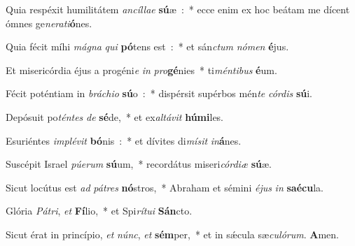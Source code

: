 ﻿\item Quia respéxit humilitátem \emph{an}\emph{cíl}\emph{lae} \textbf{sú}æ~:~* ecce enim ex hoc beátam me dícent ómnes ge\emph{ne}\emph{ra}\emph{ti}\textbf{ó}nes.
\item Quia fécit míhi \emph{má}\emph{gna} \emph{qui} \textbf{pó}tens est~:~* et sán\emph{ctum} \emph{nó}\emph{men} \textbf{é}jus.
\item Et misericórdia éjus a progéni\emph{e} \emph{in} \emph{pro}\textbf{gé}nies~* ti\emph{mén}\emph{ti}\emph{bus} \textbf{é}um.
\item Fécit poténtiam in \emph{brá}\emph{chi}\emph{o} \textbf{sú}o~:~* dispérsit supérbos mén\emph{te} \emph{cór}\emph{dis} \textbf{sú}i.
\item Depósuit po\emph{tén}\emph{tes} \emph{de} \textbf{sé}de,~* et ex\emph{al}\emph{tá}\emph{vit} \textbf{hú}\textbf{mi}les.
\item Esuriéntes \emph{im}\emph{plé}\emph{vit} \textbf{bó}nis~:~* et dívites di\emph{mí}\emph{sit} \emph{in}\textbf{á}nes.
\item Suscépit Israel \emph{pú}\emph{e}\emph{rum} \textbf{sú}um,~* recordátus miseri\emph{cór}\emph{di}\emph{æ} \textbf{sú}æ.
\item Sicut locútus est \emph{ad} \emph{pá}\emph{tres} \textbf{nó}stros,~* Abraham et sémini \emph{é}\emph{jus} \emph{in} \textbf{saé}\textbf{cu}la.
\item Glória \emph{Pá}\emph{tri}, \emph{et} \textbf{Fí}lio,~* et Spi\emph{rí}\emph{tu}\emph{i} \textbf{Sán}cto.
\item Sicut érat in princípio, \emph{et} \emph{núnc}, \emph{et} \textbf{sém}per,~* et in sǽcula sæ\emph{cu}\emph{ló}\emph{rum}. \textbf{A}men.